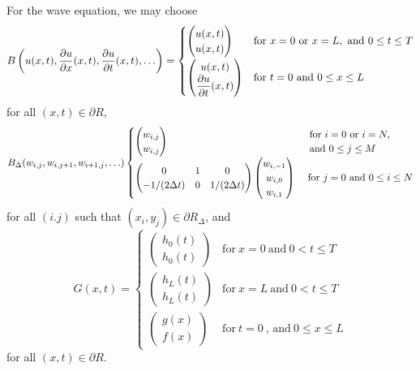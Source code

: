 \begin{egg}
For the wave equation, we may choose
\[
B\left(u(x,t), \frac{\partial{u}}{\partial{x}}(x,t), \frac{\partial{u}}{\partial{t}}(x,t), \ldots \right)
=
\begin{cases}
\begin{pmatrix} u(x,t) \\ u(x,t) \end{pmatrix}
& \text{for} \ x=0 \ \text{or} \ x=L, \ \text{and} \ 0 \leq t \leq T \\[1em]
\begin{pmatrix} u(x,t) \\ \displaystyle \frac{\partial{u}}{\partial{t}}(x,t) \end{pmatrix}
& \text{for} \ t = 0 \ \text{and} \ 0 \leq x \leq L
\end{cases}
\]
for all $(x,t) \in \partial R$,
\[
B_\Delta(w_{i,j},w_{i,j+1},w_{i+1,j}, \ldots)
\begin{cases}
\begin{pmatrix} w_{i,j} \\ w_{i,j} \end{pmatrix}
& \begin{array}{l}
\text{for} \ i=0 \ \text{or} \ i = N, \\
\text{and} \ 0 \leq j \leq M
\end{array} \\
\begin{pmatrix} 0 & 1 & 0 \\ -1/(2\Delta{t}) & 0 & 1/(2\Delta{t}) \end{pmatrix}
\begin{pmatrix} w_{i,-1} \\ w_{i,0} \\ w_{i,1}   \end{pmatrix}
& \ \text{for} \ j = 0 \ \text{and} \ 0 \leq i \leq N
\end{cases}
\]
for all $(i.j)$ such that $(x_i,y_j) \in \partial R_\Delta$, and
\[
G(x,t) =
\begin{cases}
\begin{pmatrix} h_0(t) \\ h_0(t) \end{pmatrix}
& \text{for}\ x =0 \ \text{and} \ 0 < t \leq T\\[1em]
\begin{pmatrix} h_L(t) \\ h_L(t) \end{pmatrix}
& \text{for}\ x = L \ \text{and} \ 0 < t \leq T\\[1em]
\begin{pmatrix} g(x) \\ f(x) \end{pmatrix}
& \text{for}\ t =0 \ \text{, and} \ 0 \leq x \leq L
\end{cases}
\]
for all $(x,t) \in \partial R$.
\end{egg}

